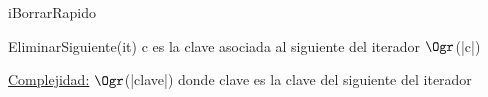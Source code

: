 \begin{Algoritmos}
	\begin{algorithm}
		\caption{iBorrarRapido}
		\begin{algorithmic}
				\State EliminarSiguiente(it) \Comment c es la clave asociada al siguiente del iterador $\Ogr$(|c|)
			\EndProcedure
		\end{algorithmic}
		\underline{Complejidad:} $\Ogr$(|clave|) donde clave es la clave del siguiente del iterador
	\end{algorithm}
	
\end{Algoritmos}